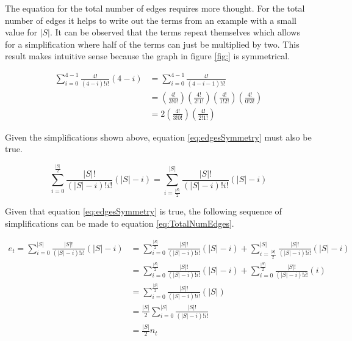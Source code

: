 \documentclass{article}
\begin{document}
The equation for the total number of edges requires more thought. For the total number of edges it helps to write out the terms from an example with a small value for $|S|$. It can be observed that the terms repeat themselves which allows for a simplification where half of the terms can just be multiplied by two. This result makes intuitive sense because the graph in figure \ref{fig:} is symmetrical.

\begin{equation*}
    \begin{split}
        \sum_{i=0}^{4-1}\frac{4!}{(4-i)!i!}(4-i)&=
        \sum_{i=0}^{4-1}\frac{4!}{(4-i-1)!i!}
        \\
        &=
        \left(\frac{4!}{3!0!}\right)
        \left(\frac{4!}{2!1!}\right)
        \left(\frac{4!}{1!2!}\right)
        \left(\frac{4!}{0!3!}\right)
        \\
        &=
        2
        \left(\frac{4!}{3!0!}\right)
        \left(\frac{4!}{2!1!}\right)
    \end{split}
\end{equation*}

Given the simplifications shown above, equation \ref{eq:edgesSymmetry} must also be true.

\begin{equation}
    \sum_{i=0}^{\frac{|S|}{2}}\frac{|S|!}{(|S|-i)!i!}\left(|S|-i\right)=
    \sum_{i=\frac{|S|}{2}}^{|S|}\frac{|S|!}{(|S|-i)!i!}\left(|S|-i\right)
    \label{eq:edgesSymmetry}
\end{equation}

Given that equation \ref{eq:edgesSymmetry} is true, the following sequence of simplifications can be made to equation \ref{eq:TotalNumEdges}.

\begin{equation*}
    \begin{split}
        e_t=\sum_{i=0}^{|S|}\frac{|S|!}{(|S|-i)!i!}\left(|S|-i\right)&=
        \sum_{i=0}^{\frac{|S|}{2}}\frac{|S|!}{(|S|-i)!i!}\left(|S|-i\right)+
        \sum_{i=\frac{|S|}{2}}^{|S|}\frac{|S|!}{(|S|-i)!i!}\left(|S|-i\right)
        \\
        &=
        \sum_{i=0}^{\frac{|S|}{2}}\frac{|S|!}{(|S|-i)!i!}\left(|S|-i\right)+
        \sum_{i=0}^{\frac{|S|}{2}}\frac{|S|!}{(|S|-i)!i!}\left(i\right)
        \\
        &=
        \sum_{i=0}^{\frac{|S|}{2}}\frac{|S|!}{(|S|-i)!i!}\left(|S|\right)
        \\
        &=
        \frac{|S|}{2}\sum_{i=0}^{|S|}\frac{|S|!}{(|S|-i)!i!}
        \\
        &=
        \frac{|S|}{2}n_t
    \end{split}
\end{equation*}
\end{document}
